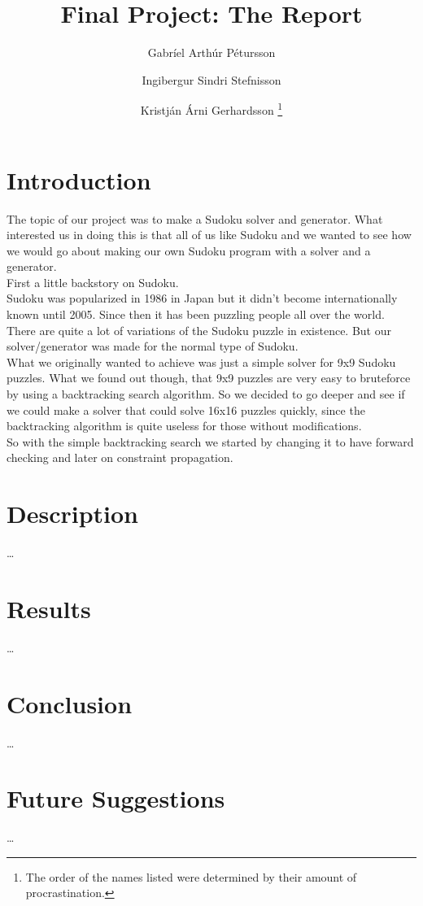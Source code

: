 \documentclass[12pt,a4paper]{article}
\title{Final Project: The Report}
\author{Gabríel Arthúr Pétursson \and Ingibergur Sindri Stefnisson \and Kristján Árni Gerhardsson
	\footnote{The order of the names listed were determined by their amount of procrastination.}}
\begin{document}
\maketitle

\clearpage


\section*{Introduction}

The topic of our project was to make a Sudoku solver and generator. What interested
us in doing this is that all of us like Sudoku and we wanted to see how we would
go about making our own Sudoku program with a solver and a generator.\\

First a little backstory on Sudoku.\\

Sudoku was popularized in 1986 in Japan but it didn't become internationally known
until 2005. Since then it has been puzzling people all over the world. 
There are quite a lot of variations of the Sudoku puzzle in existence. But our 
solver/generator was made for the normal type of Sudoku.\\

What we originally wanted to achieve was just a simple solver for 9x9 Sudoku puzzles.
What we found out though, that 9x9 puzzles are very easy to bruteforce by using
a backtracking search algorithm. So we decided to go deeper and see if we could
make a solver that could solve 16x16 puzzles quickly, since the backtracking algorithm
is quite useless for those without modifications.\\

So with the simple backtracking search we started by changing it to have forward 
checking and later on constraint propagation.

\section*{Description}

\ldots

\section*{Results}%

\ldots

\section*{Conclusion}

\ldots

\section*{Future Suggestions}

\ldots
\end{document}
